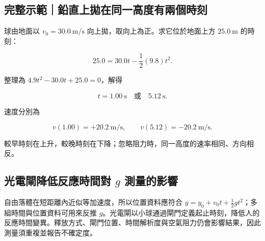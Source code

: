 \documentclass[11pt,a4paper]{article}
\begin{document}
\begin{HandoutWorkedExample}

\subsection{完整示範｜鉛直上拋在同一高度有兩個時刻}\label{ux5b8cux6574ux793aux7bc4ux925bux76f4ux4e0aux62cbux5728ux540cux4e00ux9ad8ux5ea6ux6709ux5169ux500bux6642ux523b}

球由地面以 \(v_0=30.0\ \mathrm{m/s}\) 向上拋，取向上為正。求它位於地面上方 \(25.0\ \mathrm m\) 的時刻：

\[
25.0=30.0t-\frac12(9.8)t^2.
\]

整理為 \(4.9t^2-30.0t+25.0=0\)，解得

\[
t=1.00\ \mathrm s\quad\text{或}\quad5.12\ \mathrm s.
\]

速度分別為

\[
v(1.00)=+20.2\ \mathrm{m/s},\qquad
v(5.12)=-20.2\ \mathrm{m/s}.
\]

較早時刻在上升，較晚時刻在下降；忽略阻力時，同一高度的速率相同、方向相反。

\end{HandoutWorkedExample}

\subsection{\texorpdfstring{光電閘降低反應時間對 \(g\) 測量的影響}{光電閘降低反應時間對 g 測量的影響}}\label{ux5149ux96fbux9598ux964dux4f4eux53cdux61c9ux6642ux9593ux5c0d-g-ux6e2cux91cfux7684ux5f71ux97ff}

自由落體在短距離內近似等加速度，所以位置資料應符合 \(y=y_0+v_0t+\tfrac12gt^2\)；多組時間與位置資料可用來反推 \(g\)。光電閘以小球通過閘門定義起止時刻，降低人的反應時間變異。釋放方式、閘門位置、時間解析度與空氣阻力仍會影響結果，因此測量須重複並報告不確定度。
\end{document}
